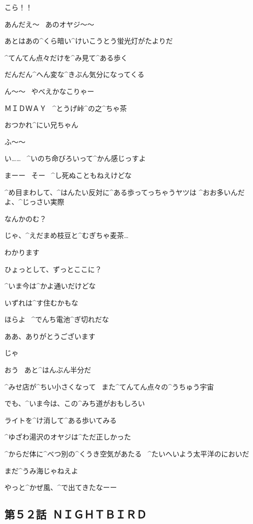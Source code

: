 \Ayase こら！！

\Ayase あんだえ〜
\ あのオヤジ〜〜

\page[113]
\Ayase あとはあの^{くら}{暗}い^{けいこうとう}{蛍光灯}がたよりだ

\Ayase ^{てんてん}{点々}だけを^{み}{見}て^{ある}{歩}く

\Ayase だんだん^{へん}{変}な^{きぶん}{気分}になってくる

\Ayase ん〜〜
\ やべえかなこりゃー

\page[115]
\Sign ＭＩＤＷＡＹ
\ ^{とうげ}{峠}^{の}{之}^{ちゃ}{茶}

\Person おつかれ^{にい}{兄}ちゃん

\Ayase ふ〜〜

\Ayase い……
\ ^{いのち}{命}びろいって^{かん}{感}じっすよ

\Person まーー
\ そー
\ ^{し}{死}ぬこともねえけどな

\Person ^{め}{目}まわして、^{はんたい}{反対}に^{ある}{歩}ってっちゃうヤツは
^{おお}{多}いんだよ、^{じっさい}{実際}

\Person なんかのむ？

\Ayase じゃ、^{えだまめ}{枝豆}と^{むぎちゃ}{麦茶}…

\Ayase わかります

\page[116]
\Ayase ひょっとして、ずっとここに？

\Person ^{いま}{今}は^{かよ}{通}いだけどな

\Person いずれは^{す}{住}むかもな

\Person ほらよ
\ ^{でんち}{電池}^{ぎ}{切}れだな

\Ayase ああ、ありがとうございます

\page[117]
\Ayase じゃ

\Person おう
\ あと^{はんぶん}{半分}だ

\Ayase ^{みせ}{店}が^{ちい}{小}さくなって
\ また^{てんてん}{点々}の^{うちゅう}{宇宙}

\Ayase でも、^{いま}{今}は、この^{みち}{道}がおもしろい

\Ayase ライトを^{け}{消}して^{ある}{歩}いてみる

\Ayase ^{ゆざわ}{湯沢}のオヤジは^{ただ}{正}しかった

\page[119]
\Ayase ^{からだ}{体}に^{べつ}{別}の^{くうき}{空気}があたる
\ ^{たいへいよう}{太平洋}のにおいだ

\Ayase まだ^{うみ}{海}じゃねえよ

\page[120]
\Alpha やっと^{かぜ}{風}、^{で}{出}てきたなーー


\subsection{第５２話\ ＮＩＧＨＴＢＩＲＤ}

